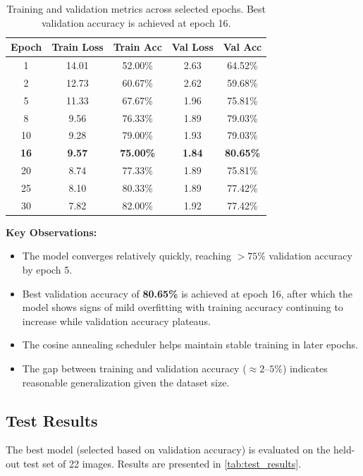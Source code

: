\documentclass[10pt,twocolumn,letterpaper]{article}
\begin{document}
\begin{table}[h]
\centering
\caption{Training and validation metrics across selected epochs. Best validation accuracy is achieved at epoch 16.}
\label{tab:training}
\begin{tabular}{ccccc}
\toprule
\textbf{Epoch} & \textbf{Train Loss} & \textbf{Train Acc} & \textbf{Val Loss} & \textbf{Val Acc} \\
\midrule
1  & 14.01 & 52.00\% & 2.63 & 64.52\% \\
2  & 12.73 & 60.67\% & 2.62 & 59.68\% \\
5  & 11.33 & 67.67\% & 1.96 & 75.81\% \\
8  & 9.56  & 76.33\% & 1.89 & 79.03\% \\
10 & 9.28  & 79.00\% & 1.93 & 79.03\% \\
\textbf{16} & \textbf{9.57}  & \textbf{75.00\%} & \textbf{1.84} & \textbf{80.65\%} \\
20 & 8.74  & 77.33\% & 1.89 & 75.81\% \\
25 & 8.10  & 80.33\% & 1.89 & 77.42\% \\
30 & 7.82  & 82.00\% & 1.92 & 77.42\% \\
\bottomrule
\end{tabular}
\end{table}

\textbf{Key Observations:}
\begin{itemize}
    \item The model converges relatively quickly, reaching $>75\%$ validation accuracy by epoch 5.
    \item Best validation accuracy of \textbf{80.65\%} is achieved at epoch 16, after which the model shows signs of mild overfitting with training accuracy continuing to increase while validation accuracy plateaus.
    \item The cosine annealing scheduler helps maintain stable training in later epochs.
    \item The gap between training and validation accuracy ($\approx 2$--$5\%$) indicates reasonable generalization given the dataset size.
\end{itemize}

\subsection{Test Results}

The best model (selected based on validation accuracy) is evaluated on the held-out test set of 22 images. Results are presented in \cref{tab:test_results}.
\end{document}
